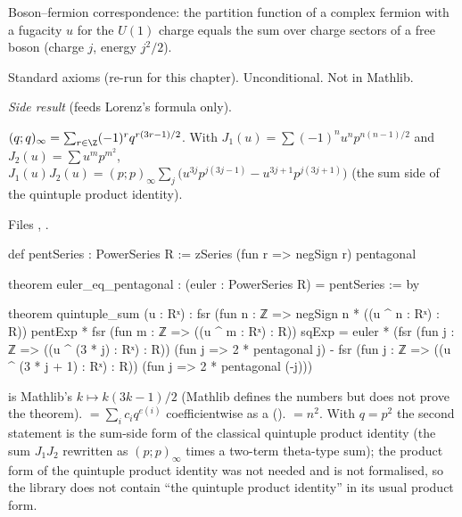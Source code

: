 \begin{physics}
Boson--fermion correspondence: the partition function of a complex fermion with a fugacity $u$ for the $U(1)$ charge
equals the sum over charge sectors of a free boson (charge $j$, energy $j^2/2$).
\end{physics}
\begin{status}
Standard axioms (re-run for this chapter). Unconditional. Not in Mathlib.
\end{status}

\noindent\emph{Side result} (feeds Lorenz's formula only).
\begin{theorem}\label{l25:thm:pent}
$(q;q)_\infty=\sum_{r\in\Z}(-1)^rq^{r(3r-1)/2}$. With $J_1(u)=\sum(-1)^nu^np^{n(n-1)/2}$ and $J_2(u)=\sum u^mp^{m^2}$,
$J_1(u)J_2(u)=(p;p)_\infty\sum_j\big(u^{3j}p^{j(3j-1)}-u^{3j+1}p^{j(3j+1)}\big)$ (the sum side of the quintuple
product identity).
\end{theorem}
\noindent Files ,
.
\begin{leancode}
def pentSeries : PowerSeries R := zSeries (fun r => negSign r) pentagonal

theorem euler_eq_pentagonal : (euler : PowerSeries R) = pentSeries := by

theorem quintuple_sum (u : Rˣ) :
    fsr (fun n : ℤ => negSign n * ((u ^ n : Rˣ) : R)) pentExp *
        fsr (fun m : ℤ => ((u ^ m : Rˣ) : R)) sqExp =
      euler * (fsr (fun j : ℤ => ((u ^ (3 * j) : Rˣ) : R)) (fun j => 2 * pentagonal j) -
        fsr (fun j : ℤ => ((u ^ (3 * j + 1) : Rˣ) : R)) (fun j => 2 * pentagonal (-j)))
\end{leancode}
\begin{dictionary}
 is Mathlib's $k\mapsto k(3k-1)/2$ (Mathlib defines the numbers but does not prove the theorem).
 $=\sum_ic_iq^{e(i)}$ coefficientwise as a  ().
 $=n^2$. With $q=p^2$ the second statement is the sum-side form of the classical quintuple product identity
(the sum $J_1J_2$ rewritten as $(p;p)_\infty$ times a two-term theta-type sum); the product form of the quintuple
product identity was not needed and is not formalised, so the library does not contain ``the quintuple product
identity'' in its usual product form.
\end{dictionary}
